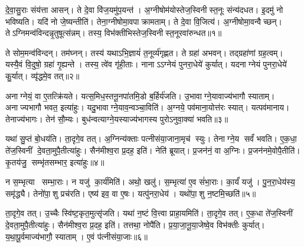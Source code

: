

\clearpage
{}
\setcounter{anuvakam}{0}
दे॒वा॒सु॒राः संय॑त्ता आसन्। ते दे॒वा वि॑ज॒यमु॑प॒यन्त॑। अ॒ग्नीषोम॑योस्तेज॒स्विनीस्त॒नूः संन्य॑दधत। इ॒दमु॑ नो भविष्यति। यदि॑ नो जे॒ष्यन्तीति॑। तेना॒ग्नीषोमा॒वपाक्रामताम्। ते दे॒वा वि॒जित्य॑। अ॒ग्नीषोमा॒वन्वैच्छन्। तेऽग्निमन्व॑\-विन्दन्नृ॒तुषूत्स॑न्नम्। तस्य॒ विभ॑क्तीभिस्तेज॒स्विनीस्त॒नू\-रवा॑रुन्धत॥१॥

ते सोम॒मन्व॑विन्दन्। तम॑घ्नन्। तस्य॑ यथाऽभि॒ज्ञायं॑ त॒नूर्व्य॑गृह्णत। ते ग्रहा॑ अभवन्। तद्ग्रहा॑णां ग्रह॒त्वम्। यस्यै॒वं वि॒दुषो॒ ग्रहा॑ गृ॒ह्यन्ते। तस्य॒ त्वे॑व गृ॑ही॒ताः। नानाऽऽग्नेयं पुनरा॒धेये॑ कुर्यात्। यदनाग्नेयं पुनरा॒धेये॑ कु॒र्यात्। व्यृ॑द्धमे॒व तत्॥२॥

अनाग्नेयं॒ वा ए॒तत्क्रि॑यते। यत्स॒मिध॒स्तनू॒नपा॑तमि॒डो ब॒र्\mbox{}हिर्य॑जति। उ॒भावाग्ने॒यावाज्य॑भागौ स्याताम्। अनाज्यभागौ भवत॒ इत्या॑हुः। यदु॒भावाग्ने॒याव॒न्वञ्चा॒विति॑। अ॒ग्नये॒ पव॑माना॒योत्त॑रः स्यात्। यत्पव॑मानाय। तेनाज्य॑भागः। तेन॑ सौ॒म्यः। बुध॑न्वत्याग्ने॒यस्याज्य॑भागस्य पुरोऽनुवा॒क्या॑ भवति॥३॥

यथा॑ सु॒प्तं बो॒धय॑ति। ता॒दृगे॒व तत्। अ॒ग्निन्य॑क्ताः पत्नीसंया॒जाना॒मृच॑ स्युः। तेनाग्ने॒य सर्वं॑ भवति। ए॒क॒धा॒ ते॑ज॒स्विनीं दे॒वता॒मुपै॒तीत्या॑हुः। सैन॑मीश्व॒रा प्र॒दह॒ इति॑। नेति॑ ब्रूयात्। प्र॒जन॑नं॒ वा अ॒ग्निः। प्र॒जन॑नमे॒वोपै॒तीति॑। कृ॒तय॑जु॒ सम्भृ॑तसम्भार॒ इत्या॑हुः॥४॥

न स॒म्भृत्या सम्भा॒राः। न यजु॑ का॒र्य॑मिति॑। अथो॒ खलु॑। स॒म्भृत्या॑ ए॒व सं॑भा॒राः। का॒र्यं॑ यजु॑। पु॒न॒रा॒धेय॑स्य॒ समृ॑द्ध्यै। तेनो॑पा॒शु प्रच॑रति। एष्य॑ इव॒ वा ए॒षः। यत्पु॑नरा॒धेय॑। यथो॑पा॒शु न॒ष्टमि॒च्छति॑॥५॥

ता॒दृगे॒व तत्। उ॒च्चैः स्वि॑ष्ट॒कृत॒मुत्सृ॑जति। यथा॑ न॒ष्टं वि॒त्त्वा प्राहा॒यमिति॑। ता॒दृगे॒व तत्। ए॒क॒धा ते॑ज॒स्विनीं दे॒वता॒मुपै॒तीत्या॑हुः। सैन॑मीश्व॒रा प्र॒दह॒ इति॑। तत्तथा॒ नोपै॑ति। प्र॒या॒जा॒नू॒या॒जेष्वे॒व विभ॑क्तीः कुर्यात्। य॒था॒पू॒र्वमाज्य॑भागौ॒ स्याताम्। ए॒वं प॑त्नीसंया॒जाः॥६॥

